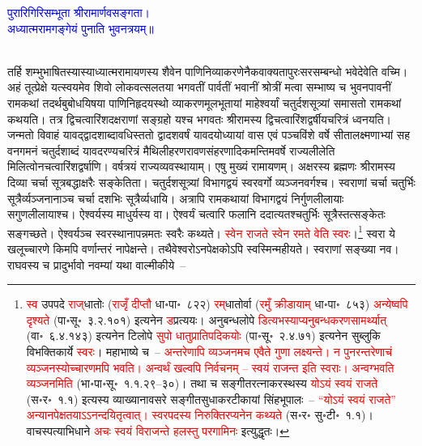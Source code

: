 \centering\textcolor{blue}{पुरारिगिरिसम्भूता श्रीरामार्णवसङ्गता।\nopagebreak\\
अध्यात्मरामगङ्गेयं पुनाति भुवनत्रयम्॥}\nopagebreak\\
\\
\begin{sloppypar}\justifying\noindent तर्हि शम्भु\-भाषितस्यास्याध्यात्म\-रामायणस्य शैवेन पाणिनि\-व्याकरणेनैक\-वाक्यता\-पुरःसर\-सम्बन्धो भवेदेवेति वच्मि। अहं तूत्प्रेक्षे यत्स्वयमेव शिवो लोक\-वत्सलतया भगवतीं पार्वतीं भवानीं श्रोत्रीं मत्वा सम्भाष्य च भुवन\-पावनीं राम\-कथां तदर्थ\-बुबोधयिषया पाणिनि\-हृदयस्थो व्याकरण\-मूल\-भूतायां माहेश्वर्यां चतुर्दश\-सूत्र्यां समासतो राम\-कथां कथयति। तत्र द्वि\-चत्वारिंशदक्षराणां सङ्ग्रहो यश्च भगवतः श्रीरामस्य द्विचत्वारिंशद्वर्षीय\-चरित्रं ध्वनयति। \label{text:exileage1}जन्मतो विवाहं यावद्द्वादशाब्दावधिस्ततो द्वादश\-वर्षं यावदयोध्यायां वास एवं पञ्चविंशे वर्षे सीता\-लक्ष्मणाभ्यां सह वन\-गमनं चतुर्दशाब्दं यावदरण्य\-चरित्रं मैथिली\-हरण\-रावण\-संहरणादिकमन्तिम\-वर्षे राज्य\-लीलेति मिलित्वोनचत्वारिंशद्वर्षाणि। वर्षत्रयं राज्य\-व्यवस्थायाम्। एषु मुख्यं रामायणम्। अक्षरस्य ब्रह्मणः श्रीरामस्य दिव्या चर्चा सूत्रबद्धाक्षरैः सङ्केतिता। चतुर्दशसूत्र्यां विभाग\-द्वयं स्वर\-वर्गो व्यञ्जनवर्गश्च। स्वराणां चर्चा चतुर्भिः सूत्रैर्व्यञ्जनानाञ्च चर्चा दशभिः सूत्रैर्व्यधायि। अत्रापि राम\-कथायां विभाग\-द्वयं निर्गुण\-लीलायाः सगुण\-लीलायाश्च। ऐश्वर्यस्य माधुर्यस्य वा। ऐश्वर्यं चत्वारि फलानि ददात्यतश्चतुर्भिः सूत्रैस्तत्सङ्केतः सङ्गच्छते। ऐश्वर्यञ्च स्वरस्थानापन्नमतः स्वरैः कथ्यते। \textcolor{red}{स्वेन राजते स्वेन रमते वेति स्वरः}।\footnote{\textcolor{red}{स्व} उपपदे \textcolor{red}{राज्‌}\-धातोः (\textcolor{red}{राजृँ दीप्तौ} धा॰पा॰~८२२) \textcolor{red}{रम्‌}\-धातोर्वा (\textcolor{red}{रमुँ क्रीडायाम्} धा॰पा॰~८५३) \textcolor{red}{अन्येष्वपि दृश्यते} (पा॰सू॰~३.२.१०१) इत्यनेन \textcolor{red}{ड}\-प्रत्ययः। अनुबन्ध\-लोपे \textcolor{red}{डित्यभस्याप्यनु\-बन्धकरण\-सामर्थ्यात्} (वा॰~६.४.१४३) इत्यनेन टिलोपे \textcolor{red}{सुपो धातु\-प्रातिपदिकयोः} (पा॰सू॰~२.४.७१) इत्यनेन सुब्लुकि विभक्तिकार्ये \textcolor{red}{स्वरः}। महाभाष्ये च~– \textcolor{red}{अन्तरेणापि व्यञ्जनमच एवैते गुणा लक्ष्यन्ते। न पुनरन्तरेणाचं व्यञ्जनस्योच्चारणमपि भवति। अन्वर्थं खल्वपि निर्वचनम् – स्वयं राजन्त इति स्वराः। अन्वग्भवति व्यञ्जनमिति} (भा॰पा॰सू॰~१.१.२९–३०)। तथा च सङ्गीत\-रत्नाकरस्थस्य \textcolor{red}{योऽयं स्वयं राजते} (स॰र॰~१.१) इत्यस्य व्याख्यानावसरे सङ्गीत\-सुधाकर\-टीकायां सिंहभूपालः~– \textcolor{red}{“योऽयं स्वयं राजते” अन्यानपेक्षतयाऽऽनन्दयितृत्वात्। स्वरपदस्य निरुक्तिरप्यनेन कथ्यते} (स॰र॰ सु॰टी॰~१.१)। वाचस्पत्याभिधाने \textcolor{red}{अचः स्वयं विराजन्ते हलस्तु परगामिनः} इत्युद्धृतः।} स्वरा ये खलूच्चारणे किमपि वर्णान्तरं नापेक्षन्ते। तथैवेश्वरोऽनपेक्षकोऽपि स्वस्मिन्महीयते। स्वराणां सङ्ख्या नव। राघवस्य च प्रादुर्भावो नवम्यां यथा वाल्मीकीये~–\end{sloppypar}
